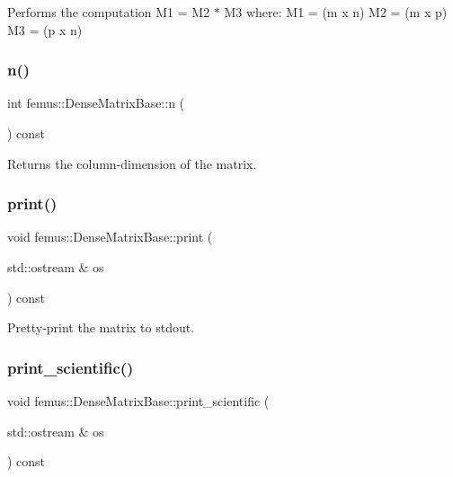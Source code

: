 Performs the computation M1 = M2 $\ast$ M3 where\+: M1 = (m x n) M2 = (m x p) M3 = (p x n) 

\mbox{\label{classfemus_1_1_dense_matrix_base_a1d9b513340794a8b15640f9c8cc6597e}} 
\subsubsection{\texorpdfstring{n()}{n()}}
{\footnotesize\ttfamily int femus\+::\+Dense\+Matrix\+Base\+::n (\begin{DoxyParamCaption}{ }\end{DoxyParamCaption}) const\hspace{0.3cm}{\ttfamily [inline]}}

\begin{DoxyReturn}{Returns}
the column-\/dimension of the matrix. 
\end{DoxyReturn}
\mbox{\label{classfemus_1_1_dense_matrix_base_a90e8d872f96927e0ad2b6ec0230446e7}} 
\subsubsection{\texorpdfstring{print()}{print()}}
{\footnotesize\ttfamily void femus\+::\+Dense\+Matrix\+Base\+::print (\begin{DoxyParamCaption}\item[{std\+::ostream \&}]{os }\end{DoxyParamCaption}) const}



Pretty-\/print the matrix to {\ttfamily stdout}. 

\mbox{\label{classfemus_1_1_dense_matrix_base_a9124c00c4f77e51655d3efe02c00977f}} 
\subsubsection{\texorpdfstring{print\+\_\+scientific()}{print\_scientific()}}
{\footnotesize\ttfamily void femus\+::\+Dense\+Matrix\+Base\+::print\+\_\+scientific (\begin{DoxyParamCaption}\item[{std\+::ostream \&}]{os }\end{DoxyParamCaption}) const}



